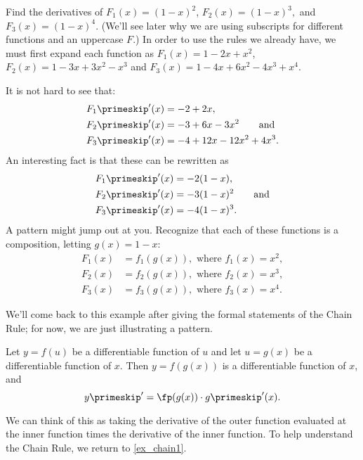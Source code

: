 \begin{example}\label{ex_chain1}
Find the derivatives of $F_1(x) = (1-x)^2$, $F_2(x) = (1-x)^3,$ and $F_3(x) = (1-x)^4.$ (We'll see later why we are using subscripts for different functions and an uppercase $F$.)
\solution
In order to use the rules we already have, we must first expand each function as
$F_1(x) = 1 - 2x + x^2$,  $F_2(x) = 1 - 3x + 3x^2 - x^3$ and $F_3(x) = 1 - 4x + 6x^2 - 4x^3 + x^4$.
  
It is not hard to see that:
\begin{align*}
F_1\primeskip'(x) &= -2 + 2x,\\
F_2\primeskip'(x) &= -3 + 6x - 3x^2\qquad\text{and}\\
F_3\primeskip'(x) &= -4 + 12x - 12x^2 + 4x^3.
\end{align*}
An interesting fact is that these can be rewritten as
\begin{align*}
F_1\primeskip'(x) &= -2(1-x),\\
F_2\primeskip'(x) &= -3(1-x)^2\qquad\text{and} \\
F_3\primeskip'(x) &= -4(1-x)^3.
\end{align*}
A pattern might jump out at you.  Recognize that each of these functions is a composition, letting $g(x) = 1-x$:
\begin{align*}
F_1(x) &= f_1(g(x)), \text{ where } f_1(x) = x^2,\\
F_2(x) &= f_2(g(x)), \text{ where } f_2(x) = x^3,\\
F_3(x) &= f_3(g(x)), \text{ where } f_3(x) = x^4.
\end{align*}

We'll come back to this example after giving the formal statements of the Chain Rule; for now, we are just illustrating a pattern.
\end{example}

\begin{theorem}\label{thm:chain_rule}
Let $y = f(u)$ be a differentiable function of $u$ and let $u = g(x)$ be a differentiable function of $x$. Then $y=f(g(x))$ is a differentiable function of $x$, and \[y\primeskip' = \fp(g(x))\cdot g\primeskip'(x).\]
\end{theorem}

We can think of this as taking the derivative of the outer function evaluated at the inner function times the derivative of the inner function. To help  understand the Chain Rule, we return to \autoref{ex_chain1}.

